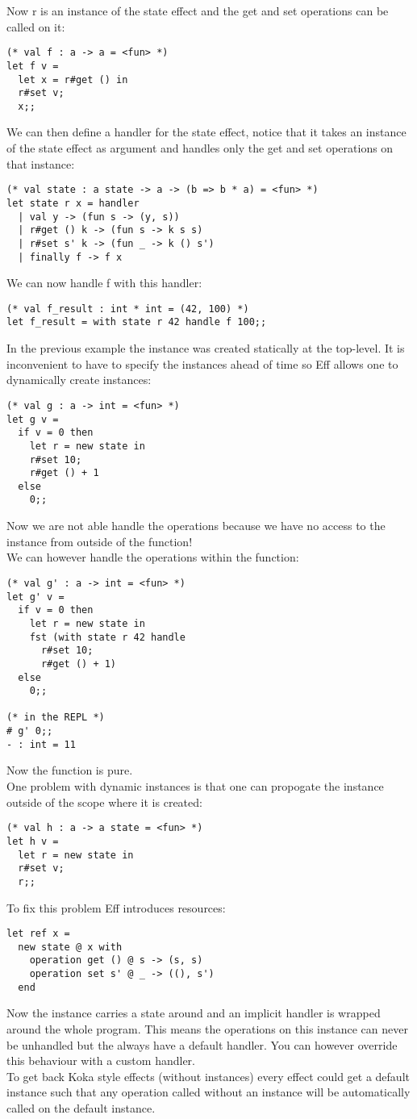 \documentclass[12pt]{article}
\begin{document}
Now r is an instance of the state effect and the get and set operations can be called on it:
\begin{lstlisting}
(* val f : a -> a = <fun> *)
let f v =
  let x = r#get () in
  r#set v;
  x;;
\end{lstlisting}
We can then define a handler for the state effect, notice that it takes an instance of the state effect as argument and handles only the get and set operations on that instance:
\begin{lstlisting}
(* val state : a state -> a -> (b => b * a) = <fun> *)
let state r x = handler
  | val y -> (fun s -> (y, s))
  | r#get () k -> (fun s -> k s s)
  | r#set s' k -> (fun _ -> k () s')
  | finally f -> f x
\end{lstlisting}
We can now handle f with this handler:
\begin{lstlisting}
(* val f_result : int * int = (42, 100) *)
let f_result = with state r 42 handle f 100;;
\end{lstlisting}
\newpage
In the previous example the instance was created statically at the top-level.
It is inconvenient to have to specify the instances ahead of time so Eff allows one to dynamically create instances:
\begin{lstlisting}
(* val g : a -> int = <fun> *)
let g v =
  if v = 0 then
    let r = new state in
    r#set 10;
    r#get () + 1
  else
    0;;
\end{lstlisting}
Now we are not able handle the operations because we have no access to the instance from outside of the function! \\
We can however handle the operations within the function:
\begin{lstlisting}
(* val g' : a -> int = <fun> *)
let g' v =
  if v = 0 then
    let r = new state in
    fst (with state r 42 handle
      r#set 10;
      r#get () + 1)
  else
    0;;

(* in the REPL *)
# g' 0;;
- : int = 11
\end{lstlisting}
Now the function is pure.\\
One problem with dynamic instances is that one can propogate the instance outside of the scope where it is created:
\begin{lstlisting}
(* val h : a -> a state = <fun> *)
let h v =
  let r = new state in
  r#set v;
  r;;
\end{lstlisting}
\newpage
To fix this problem Eff introduces resources:
\begin{lstlisting}
let ref x =
  new state @ x with
    operation get () @ s -> (s, s)
    operation set s' @ _ -> ((), s')
  end
\end{lstlisting}
Now the instance carries a state around and an implicit handler is wrapped around the whole program.
This means the operations on this instance can never be unhandled but the always have a default handler.
You can however override this behaviour with a custom handler.\\
To get back Koka style effects (without instances) every effect could get a default instance such that any operation called without an instance will be automatically called on the default instance.
\end{document}
